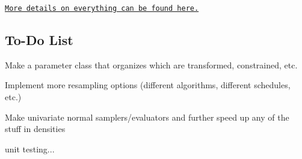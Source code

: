 \href{https://tbrown122387.github.io/ssm/}{\tt More details on everything can be found here.}

\subsection*{To-\/\+Do List}


\begin{DoxyItemize}
\item Make a parameter class that organizes which are transformed, constrained, etc.
\item Implement more resampling options (different algorithms, different schedules, etc.)
\item Make univariate normal samplers/evaluators and further speed up any of the stuff in {\ttfamily densities}
\item unit testing... 
\end{DoxyItemize}